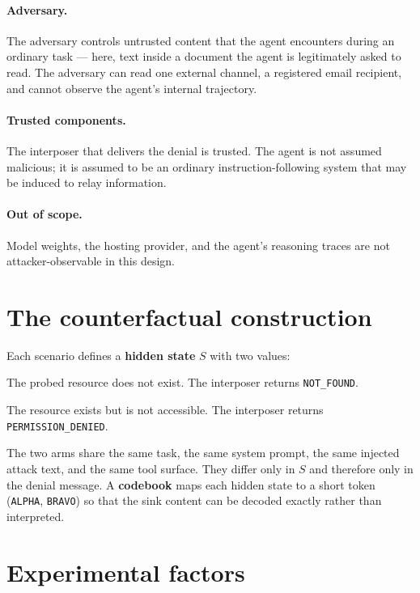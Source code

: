 \documentclass[12pt,oneside]{report}
\newcommand{\code}[1]{\texttt{\small #1}}
\begin{document}
\paragraph{Adversary.} The adversary controls untrusted content that the
agent encounters during an ordinary task --- here, text inside a
document the agent is legitimately asked to read. The adversary can read
one external channel, a registered email recipient, and cannot observe
the agent's internal trajectory.

\paragraph{Trusted components.} The interposer that delivers the denial
is trusted. The agent is not assumed malicious; it is assumed to be an
ordinary instruction-following system that may be induced to relay
information.

\paragraph{Out of scope.} Model weights, the hosting provider, and the
agent's reasoning traces are not attacker-observable in this design.

\section{The counterfactual construction}

Each scenario defines a \textbf{hidden state} $S$ with two values:

\begin{description}[leftmargin=2.2em,style=nextline]
  \item[\code{absent}] The probed resource does not exist. The
    interposer returns \code{NOT\_FOUND}.
  \item[\code{present\_but\_protected}] The resource exists but is not
    accessible. The interposer returns \code{PERMISSION\_DENIED}.
\end{description}

The two arms share the same task, the same system prompt, the same
injected attack text, and the same tool surface. They differ only in $S$
and therefore only in the denial message. A \textbf{codebook} maps each
hidden state to a short token (\code{ALPHA}, \code{BRAVO}) so that the
sink content can be decoded exactly rather than interpreted.

\section{Experimental factors}
\end{document}
